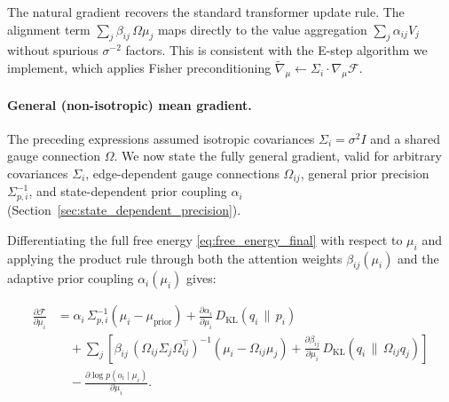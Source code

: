 \documentclass[twoside,11pt]{article}
\begin{document}
The natural gradient recovers the standard transformer update rule. The alignment term $\sum_j \beta_{ij}\,\Omega\mu_j$ maps directly to the value aggregation $\sum_j \alpha_{ij} V_j$ without spurious $\sigma^{-2}$ factors. This is consistent with the E-step algorithm we implement, which applies Fisher preconditioning $\tilde{\nabla}_\mu \leftarrow \Sigma_i \cdot \nabla_\mu \mathcal{F}$.

\paragraph{General (non-isotropic) mean gradient.}
The preceding expressions assumed isotropic covariances $\Sigma_i = \sigma^2 I$ and a shared gauge connection $\Omega$. We now state the fully general gradient, valid for arbitrary covariances $\Sigma_i$, edge-dependent gauge connections $\Omega_{ij}$, general prior precision $\Sigma_{p,i}^{-1}$, and state-dependent prior coupling $\alpha_i$ (Section~\ref{sec:state_dependent_precision}).

Differentiating the full free energy \eqref{eq:free_energy_final} with respect to $\mu_i$ and applying the product rule through both the attention weights $\beta_{ij}(\mu_i)$ and the adaptive prior coupling $\alpha_i(\mu_i)$ gives:

\begin{equation}
\boxed{
\begin{aligned}
\frac{\partial \mathcal{F}}{\partial \mu_i}
&= \alpha_i\,\Sigma_{p,i}^{-1}\left(\mu_i - \mu_{\text{prior}}\right)
    + \frac{\partial \alpha_i}{\partial \mu_i}\,
      D_{\mathrm{KL}}(q_i \,\|\, p_i) \\
&\quad + \sum_j \left[
    \beta_{ij}\,
    \left(\Omega_{ij}\Sigma_j\Omega_{ij}^\top\right)^{-1}
    \left(\mu_i - \Omega_{ij}\mu_j\right)
    + \frac{\partial \beta_{ij}}{\partial \mu_i}\,
      D_{\mathrm{KL}}(q_i \,\|\, \Omega_{ij} q_j)
\right] \\
&\quad - \frac{\partial \log p(o_i \mid \mu_i)}{\partial \mu_i}.
\end{aligned}
}
\label{eq:mu_gradient_general}
\end{equation}
\end{document}
